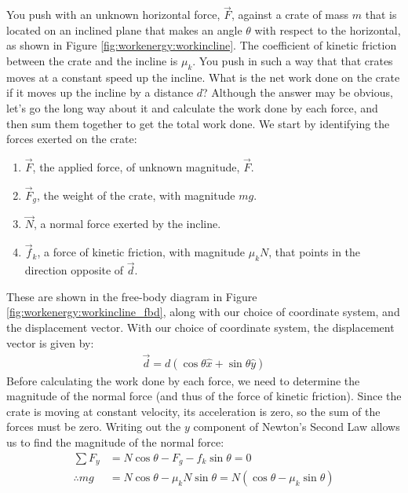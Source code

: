 \begin{example}{\label{ex:workenergy:networkramp}
You push with an unknown horizontal force, $\vec F$, against a crate of mass $m$ that is located on an inclined plane that makes an angle $\theta$ with respect to the horizontal, as shown in Figure \ref{fig:workenergy:workincline}. The coefficient of kinetic friction between the crate and the incline is $\mu_k$. You push in such a way that that crates moves at a constant speed up the incline. What is the net work done on the crate if it moves up the incline by a distance $d$?}
Although the answer may be obvious, let's go the long way about it and calculate the work done by each force, and then sum them together to get the total work done. We start by identifying the forces exerted on the crate:
\begin{enumerate}
\item $\vec F$, the applied force, of unknown magnitude, $\vec F$.
\item $\vec F_g$, the weight of the crate, with magnitude $mg$. 
\item $\vec N$, a normal force exerted by the incline.
\item $\vec f_k$, a force of kinetic friction, with magnitude $\mu_k N$, that points in the direction opposite of $\vec d$. 
\end{enumerate}
These are shown in the free-body diagram in Figure \ref{fig:workenergy:workincline_fbd}, along with our choice of coordinate system, and the displacement vector. 
With our choice of coordinate system, the displacement vector is given by:
\begin{align*}
\vec d = d (\cos\theta \hat x + \sin\theta \hat y)
\end{align*}
Before calculating the work done by each force, we need to determine the magnitude of the normal force (and thus of the force of kinetic friction). Since the crate is moving at constant velocity, its acceleration is zero, so the sum of the forces must be zero. Writing out the $y$ component of Newton's Second Law allows us to find the magnitude of the normal force:
\begin{align*}
\sum F_y &= N\cos\theta -F_g - f_k\sin\theta = 0\\
\therefore mg &= N\cos\theta-\mu_kN\sin\theta = N(\cos\theta-\mu_k\sin\theta)\\

\end{align*}
\end{example}
